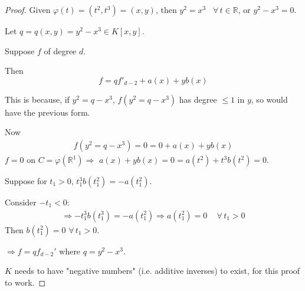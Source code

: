 \begin{proof}
	Given $\varphi(t) = (t^2, t^3) = (x,y)$, then $y^2 = x^3$ \, $\forall \, t \in \mathbb{R}$, or $y^2 - x^3 = 0$.
	
	Let $q= q(x,y) = y^2 - x^3 \in K[x,y]$.
	
	Suppose $f$ of degree $d$.
	
	Then 
	\[
	f = q f'_{d-2} + a(x) + y b(x)
	\]
	
	This is because, if $y^2 = q- x^3$, $f(y^2 = q- x^3)$ has degree $\leq 1$ in $y$, so would have the previous form.
	
	Now 
	\[
	\begin{gathered}
	f(y^2 = q- x^3) = 0 = 0 + a(x) + yb(x)
	\end{gathered}
	\]
	$f = 0$ on $C = \varphi(\mathbb{R}^1) \Longrightarrow $ $a(x) + yb(x) =0 = a(t^2) + t^3 b(t^2) = 0$.
	
	Suppose for $t_1 > 0$, $t_1^3 b(t_1^2) = -a(t_1^2)$. 
	
	Consider $-t_1 < 0$: 
	\[
	\begin{gathered}
	\Longrightarrow -t_1^3 b(t_1^3) = -a(t_1^2) \Longrightarrow a(t_1^2) = 0 \quad \, \forall \, t_1 >0
	\end{gathered}
	\]
	Then $b(t_1^2) = 0$ $\forall \, t_1 > 0$.
	
	$\Longrightarrow f = qf_{d-2}'$ where $q = y^2-x^3$.
	
	$K$ needs to have "negative numbers" (i.e. additive inverses) to exist, for this proof to work.
	\end{proof}	

